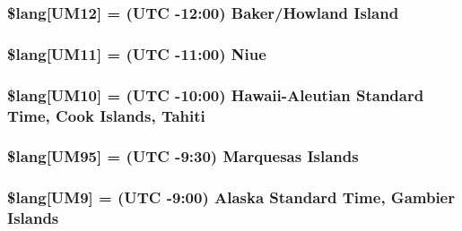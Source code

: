 \subsubsection[{\$lang}]{\setlength{\rightskip}{0pt plus 5cm}\$lang\mbox{[}\textquotesingle{}U\+M12\textquotesingle{}\mbox{]} = \textquotesingle{}(U\+T\+C -\/12\+:00) Baker/Howland Island\textquotesingle{}}\label{date__lang_8php_aa03db528f49f0bdd57489a7e057a95dc}
\hypertarget{date__lang_8php_a2257b69398113162bdafb48f1bab4973}{}
\subsubsection[{\$lang}]{\setlength{\rightskip}{0pt plus 5cm}\$lang\mbox{[}\textquotesingle{}U\+M11\textquotesingle{}\mbox{]} = \textquotesingle{}(U\+T\+C -\/11\+:00) Niue\textquotesingle{}}\label{date__lang_8php_a2257b69398113162bdafb48f1bab4973}
\hypertarget{date__lang_8php_a671d507e120e16f7e7718be0ed0aea74}{}
\subsubsection[{\$lang}]{\setlength{\rightskip}{0pt plus 5cm}\$lang\mbox{[}\textquotesingle{}U\+M10\textquotesingle{}\mbox{]} = \textquotesingle{}(U\+T\+C -\/10\+:00) Hawaii-\/Aleutian Standard Time, Cook Islands, Tahiti\textquotesingle{}}\label{date__lang_8php_a671d507e120e16f7e7718be0ed0aea74}
\hypertarget{date__lang_8php_a7cd7a4418ccf42c7daae2a098ba8f9e6}{}
\subsubsection[{\$lang}]{\setlength{\rightskip}{0pt plus 5cm}\$lang\mbox{[}\textquotesingle{}U\+M95\textquotesingle{}\mbox{]} = \textquotesingle{}(U\+T\+C -\/9\+:30) Marquesas Islands\textquotesingle{}}\label{date__lang_8php_a7cd7a4418ccf42c7daae2a098ba8f9e6}
\hypertarget{date__lang_8php_a5509302f8ddd971cb58e1f49f012bbac}{}
\subsubsection[{\$lang}]{\setlength{\rightskip}{0pt plus 5cm}\$lang\mbox{[}\textquotesingle{}U\+M9\textquotesingle{}\mbox{]} = \textquotesingle{}(U\+T\+C -\/9\+:00) Alaska Standard Time, Gambier Islands\textquotesingle{}}\label{date__lang_8php_a5509302f8ddd971cb58e1f49f012bbac}
\hypertarget{date__lang_8php_ab3ed4c273fcb61197ef7d8e4bae07415}{}
